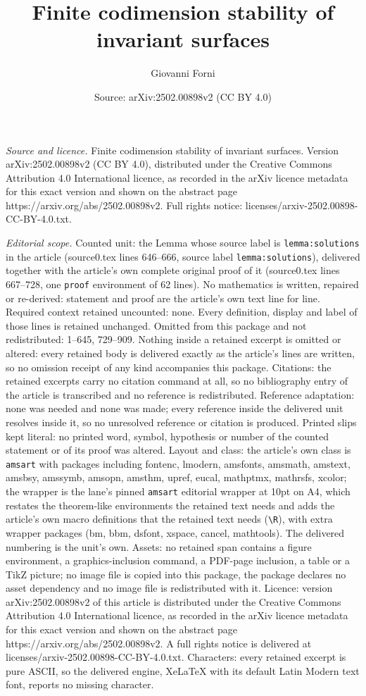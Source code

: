 \documentclass[10pt,a4paper]{amsart}
\title[Finite codimension stability of invariant surfaces]{Finite codimension stability of invariant surfaces}
\author{Giovanni Forni}
\date{Source: arXiv:2502.00898v2 (CC BY 4.0)}
\begin{document}
\maketitle

\noindent\emph{Source and licence.} Finite codimension stability of invariant surfaces. Version arXiv:2502.00898v2 (CC BY 4.0), distributed under the Creative Commons Attribution 4.0 International licence, as recorded in the arXiv licence metadata for this exact version and shown on the abstract page https://arxiv.org/abs/2502.00898v2. Full rights notice: licenses/arxiv-2502.00898-CC-BY-4.0.txt.\par\smallskip

\noindent\textit{Editorial scope.} Counted unit: the Lemma whose source label is \texttt{lemma:solutions} in the article (source0.tex lines 646--666, source label \texttt{lemma:solutions}), delivered together with the article's own complete original proof of it (source0.tex lines 667--728, one \texttt{proof} environment of 62 lines). No mathematics is written, repaired or re-derived: statement and proof are the article's own text line for line. Required context retained uncounted: none. Every definition, display and label of those lines is retained unchanged. Omitted from this package and not redistributed: 1--645, 729--909. Nothing inside a retained excerpt is omitted or altered: every retained body is delivered exactly as the article's lines are written, so no omission receipt of any kind accompanies this package. Citations: the retained excerpts carry no citation command at all, so no bibliography entry of the article is transcribed and no reference is redistributed. Reference adaptation: none was needed and none was made; every reference inside the delivered unit resolves inside it, so no unresolved reference or citation is produced. Printed slips kept literal: no printed word, symbol, hypothesis or number of the counted statement or of its proof was altered. Layout and class: the article's own class is \texttt{amsart} with packages including fontenc, lmodern, amsfonts, amsmath, amstext, amsbsy, amssymb, amsopn, amsthm, upref, eucal, mathptmx, mathrsfs, xcolor; the wrapper is the lane's pinned \texttt{amsart} editorial wrapper at 10pt on A4, which restates the theorem-like environments the retained text needs and adds the article's own macro definitions that the retained text needs (\texttt{\textbackslash R}), with extra wrapper packages (bm, bbm, dsfont, xspace, cancel, mathtools). The delivered numbering is the unit's own. Assets: no retained span contains a figure environment, a graphics-inclusion command, a PDF-page inclusion, a table or a TikZ picture; no image file is copied into this package, the package declares no asset dependency and no image file is redistributed with it. Licence: version arXiv:2502.00898v2 of this article is distributed under the Creative Commons Attribution 4.0 International licence, as recorded in the arXiv licence metadata for this exact version and shown on the abstract page https://arxiv.org/abs/2502.00898v2. A full rights notice is delivered at licenses/arxiv-2502.00898-CC-BY-4.0.txt. Characters: every retained excerpt is pure ASCII, so the delivered engine, XeLaTeX with its default Latin Modern text font, reports no missing character.
\end{document}
